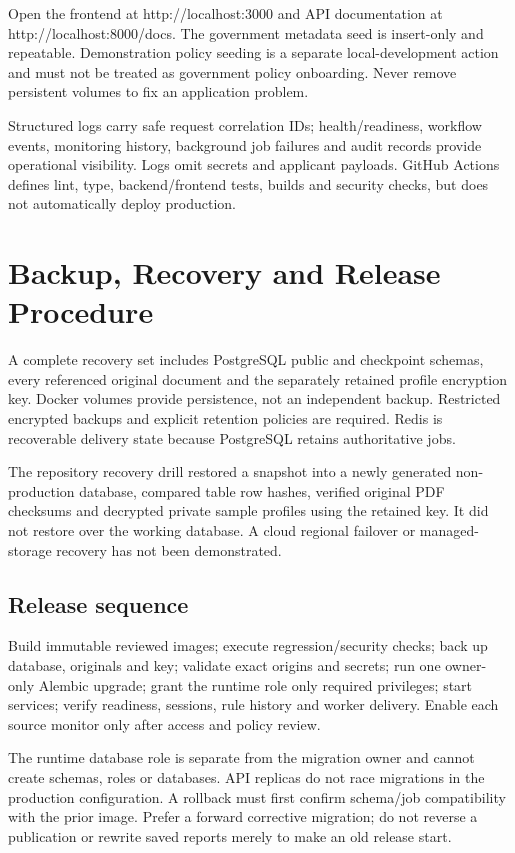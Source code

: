\documentclass[12pt,a4paper,twoside]{report}
\begin{document}
Open the frontend at http://localhost:3000 and API documentation at http://localhost:8000/docs. The government metadata seed is insert-only and repeatable. Demonstration policy seeding is a separate local-development action and must not be treated as government policy onboarding. Never remove persistent volumes to fix an application problem.

Structured logs carry safe request correlation IDs; health/readiness, workflow events, monitoring history, background job failures and audit records provide operational visibility. Logs omit secrets and applicant payloads. GitHub Actions defines lint, type, backend/frontend tests, builds and security checks, but does not automatically deploy production.

\section{Backup, Recovery and Release Procedure}

A complete recovery set includes PostgreSQL public and checkpoint schemas, every referenced original document and the separately retained profile encryption key. Docker volumes provide persistence, not an independent backup. Restricted encrypted backups and explicit retention policies are required. Redis is recoverable delivery state because PostgreSQL retains authoritative jobs.

The repository recovery drill restored a snapshot into a newly generated non-production database, compared table row hashes, verified original PDF checksums and decrypted private sample profiles using the retained key. It did not restore over the working database. A cloud regional failover or managed-storage recovery has not been demonstrated.

\subsection*{Release sequence}

Build immutable reviewed images; execute regression/security checks; back up database, originals and key; validate exact origins and secrets; run one owner-only Alembic upgrade; grant the runtime role only required privileges; start services; verify readiness, sessions, rule history and worker delivery. Enable each source monitor only after access and policy review.

The runtime database role is separate from the migration owner and cannot create schemas, roles or databases. API replicas do not race migrations in the production configuration. A rollback must first confirm schema/job compatibility with the prior image. Prefer a forward corrective migration; do not reverse a publication or rewrite saved reports merely to make an old release start.
\end{document}
